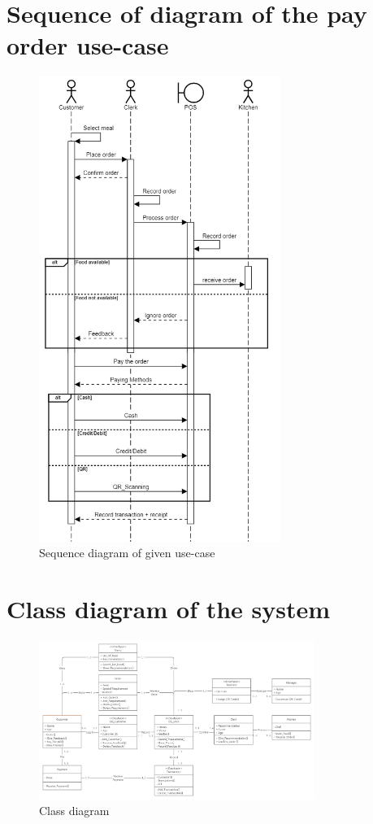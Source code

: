 \section{Sequence of diagram of the pay order use-case}
\begin{figure}[H]
  \centering
  \includegraphics[width=0.7\textwidth]{./assets/t2/sqd_2.3.png}
  \caption{Sequence diagram of given use-case}
\end{figure}

\section{Class diagram of the system}
\begin{figure}[H]
  \centering
  \includegraphics[width=0.8\textwidth]{./assets/t2/Class Diagram.png}
  \caption{Class diagram}
\end{figure}
